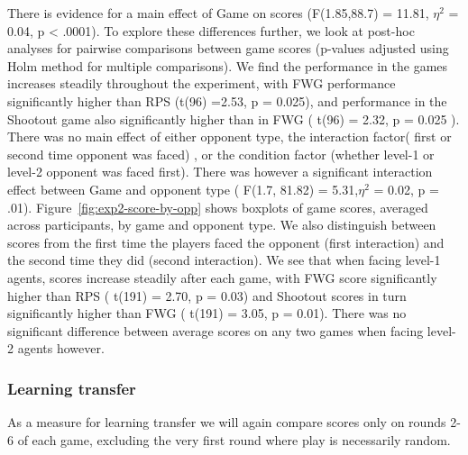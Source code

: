 \documentclass[man,floatsintext]{apa6}
\begin{document}
There is evidence for a main effect of Game on scores (F(1.85,88.7) = 11.81, \(\eta^{2}\) = 0.04, p \textless{} .0001). To explore these differences further, we look at post-hoc analyses for pairwise comparisons between game scores (p-values adjusted using Holm method for multiple comparisons). We find the performance in the games increases steadily throughout the experiment, with FWG performance significantly higher than RPS (t(96) =2.53, p = 0.025), and performance in the Shootout game also significantly higher than in FWG ( t(96) = 2.32, p = 0.025 ). There was no main effect of either opponent type, the interaction factor( first or second time opponent was faced) , or the condition factor (whether level-1 or level-2 opponent was faced first). There was however a significant interaction effect between Game and opponent type ( F(1.7, 81.82) = 5.31,\(\eta^{2}\) = 0.02, p = .01).
Figure~\ref{fig:exp2-score-by-opp} shows boxplots of game scores, averaged across participants, by game and opponent type. We also distinguish between scores from the first time the players faced the opponent (first interaction) and the second time they did (second interaction). We see that when facing level-1 agents, scores increase steadily after each game, with FWG score significantly higher than RPS ( t(191) = 2.70, p = 0.03) and Shootout scores in turn significantly higher than FWG ( t(191) = 3.05, p = 0.01). There was no significant difference between average scores on any two games when facing level-2 agents however.

\hypertarget{learning-transfer-1}{%
\subsubsection{Learning transfer}\label{learning-transfer-1}}

As a measure for learning transfer we will again compare scores only on rounds 2-6 of each game, excluding the very first round where play is necessarily random.
\end{document}
